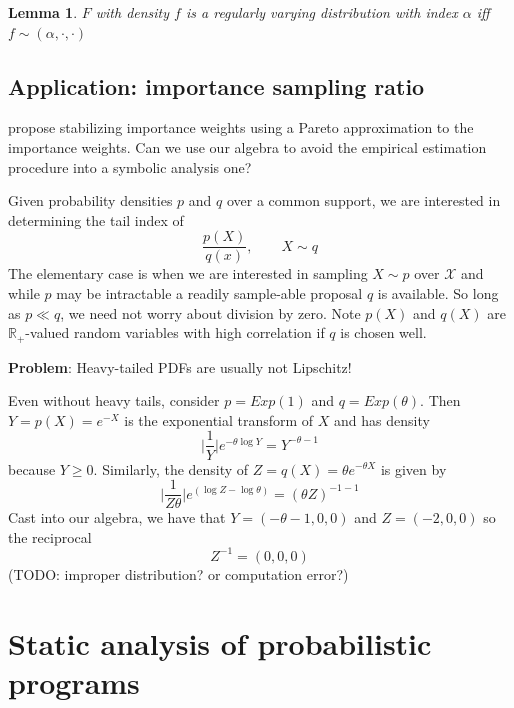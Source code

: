 \documentclass{article}
\newtheorem{lemma}[theorem]{Lemma}
\theoremstyle{definition}
\begin{document}
\begin{lemma}
    $F$ with density $f$ is a regularly varying distribution with
    index $\alpha$ iff $f \sim (\alpha, \cdot, \cdot)$
\end{lemma}

\subsection{Application: importance sampling ratio}

\cite{vehtari2015pareto} propose stabilizing importance weights using a Pareto approximation to the importance weights. Can we use our algebra to avoid the empirical estimation procedure \cite{zhang2009new} into a symbolic analysis one?

Given probability densities $p$ and $q$ over a common support, we are interested in determining the tail index of
\[
    \frac{p(X)}{q(x)},\qquad X \sim q
\]
The elementary case is when we are interested in sampling $X \sim p$ over $\mathcal{X}$ and while $p$ may be intractable a readily sample-able proposal $q$ is available. 
So long as $p \ll q$, we need not worry about division by zero.
Note $p(X)$ and $q(X)$ are $\mathbb{R}_+$-valued random variables with high correlation if $q$ is chosen well. 

\textbf{Problem}: Heavy-tailed PDFs are usually not Lipschitz!

Even without heavy tails, consider $p = Exp(1)$ and $q = Exp(\theta)$. Then
$Y = p(X) = e^{-X}$ is the exponential transform of $X$ and has density 
\[
    \lvert \frac{1}{Y} \rvert e^{-\theta \log Y}
    = Y^{-\theta - 1}
\]
because $Y \geq 0$. Similarly, the density of $Z = q(X) = \theta e^{-\theta X}$ is given by
\[
\lvert \frac{1}{Z \theta} \rvert e^{(\log Z - \log \theta )}
= (\theta Z)^{-1-1}
\]
Cast into our algebra, we have that $Y = (-\theta-1,0,0)$ and $Z = (-2,0,0)$
so the reciprocal
\[
    Z^{-1} = (0, 0, 0)
\]
(TODO: improper distribution? or computation error?)


\section{Static analysis of probabilistic programs}
\end{document}
